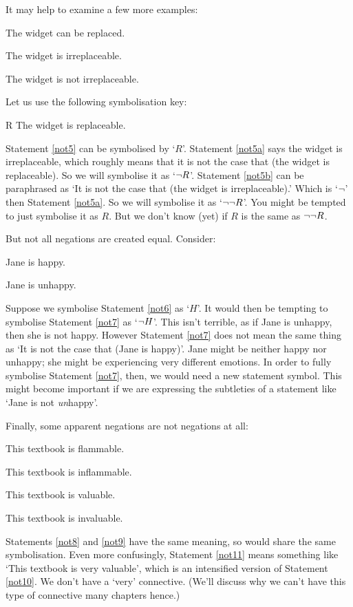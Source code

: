 \documentclass[PHIL101-Textbook.tex]{subfiles}
\begin{document}
\noindent It may help to examine a few more examples:
	\begin{earg}
		\item[\ex{not5}] The widget can be replaced.
		\item[\ex{not5a}] The widget is irreplaceable.
		\item[\ex{not5b}] The widget is not irreplaceable.
	\end{earg}
Let us use the following symbolisation key:
	\begin{ekey}
		\item[R] The widget is replaceable.
	\end{ekey}
Statement \ref{not5} can be symbolised by `$R$'. Statement \ref{not5a} says the widget is irreplaceable, which roughly means that it is not the case that (the widget is replaceable). So we will symbolise it as `$\neg R$'.
Statement  \ref{not5b} can be paraphrased as `It is not the case that (the widget is irreplaceable).' Which is `$\neg$' then Statement \ref{not5a}. So we will symbolise it as `$\neg\neg R$'.
You might be tempted to just symbolise it as $R$. But we don't know (yet) if $R$ is the same as $\neg\neg R$.

But not all negations are created equal. Consider:
	\begin{earg}
		\item[\ex{not6}] Jane is happy.
		\item[\ex{not7}] Jane is unhappy.
	\end{earg}
Suppose we symbolise Statement \ref{not6} as `$H$'. It would then be tempting to symbolise Statement \ref{not7} as `$\neg{H}$'. This isn't terrible, as if Jane is unhappy, then she is not happy. However Statement \ref{not7} does not mean the same thing as `It is not the case that (Jane is happy)'. Jane might be neither happy nor unhappy; she might be experiencing very different emotions. In order to fully symbolise Statement \ref{not7}, then, we would need a new statement symbol. This might become important if we are expressing the subtleties of a statement like `Jane is not \emph{un}happy'.

Finally, some apparent negations are not negations at all:
	\begin{earg}
		\item[\ex{not8}] This textbook is flammable.
		\item[\ex{not9}] This textbook is inflammable.
		\item[\ex{not10}] This textbook is valuable.
		\item[\ex{not11}] This textbook is invaluable.
	\end{earg}
Statements \ref{not8} and \ref{not9} have the same meaning, so would share the same symbolisation. Even more confusingly, Statement \ref{not11} means something like `This textbook is very valuable', which is an intensified version of Statement \ref{not10}. We don't have a `very' connective. (We'll discuss why we can't have this type of connective  many chapters hence.)
\end{document}
